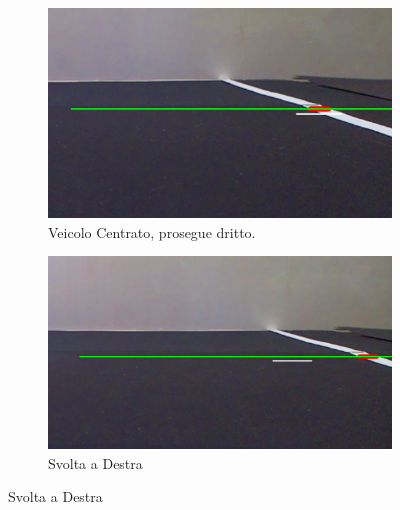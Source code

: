 \documentclass{article}
\begin{document}
\begin{figure}[h!]
    \centering
    \captionsetup[subfigure]{labelformat=parens, labelsep=space}

    \begin{subfigure}[b]{0.7\linewidth}
        \centering
        \includegraphics[width=\linewidth]{centro.png}
        \caption{Veicolo Centrato, prosegue dritto.}
        \label{fig:centro}
    \end{subfigure}

    \vspace{0.8em} 

    \begin{subfigure}[b]{0.7\linewidth}
        \centering
        \includegraphics[width=\linewidth]{destra.png}
        \caption{Svolta a Destra}
        \label{fig:destra}
    \end{subfigure}

    \vspace{0.8em}


\end{figure}
\end{document}
